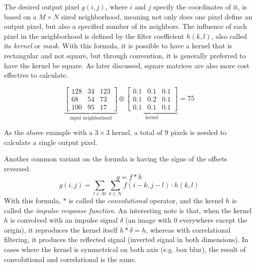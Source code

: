 \documentclass[twoside,a4paper,article]{combine}
\begin{document}
The desired output pixel $g(i, j)$, where $i$ and $j$ specify the
coordinates of it, is based on a $M \times N$ sized neighborhood, 
meaning not only does one pixel define an output pixel, but also a specified number
of its neighbors. The influence of each pixel in the neighborhood is defined by the filter coefficient $h(k, l)$,
also called its \emph{kernel} or \emph{mask}\cite{Szeliski_2022}. With this formula, it is possible to have a kernel that is rectangular and not square,
but through convention, it is generally preferred to have the kernel be square. As later discussed, square matrices are also more cost effective to calculate.

\[
\underbrace{
    \begin{bmatrix}
        128 & 34 & 123\\
        68 & 54 & 73 \\
        100 & 95 & 17
    \end{bmatrix}}_{\text{input neighborhood}}
\otimes
\underbrace{
    \begin{bmatrix}
        0.1 & 0.1 & 0.1\\
        0.1 & 0.2 & 0.1\\
        0.1 & 0.1 & 0.1
    \end{bmatrix}}_{\text{kernel}}
= 75
\]

As the above example with a $3 \times 3$ kernel, a total of 9 pixels is needed to calculate a single output pixel.

Another common variant on the formula is having the signs of the offsets reversed. 
\[
    g = f \ast h
\]
\[
    g(i,j) = \sum_{l \in \mathscr{M}}\sum_{k \in \mathscr{N}}{f(i-k, j-l) \cdot h(k, l)}
\]
With this formula, $\ast$ is called the \emph{convolutional} operator, and the kernel $h$ is called the \emph{impulse response function}. 
An interesting note is that, when the kernel $h$ is convolved with an impulse signal $\delta$ (an image with 0 everywhere except the origin),
it reproduces the kernel itself $h \ast \delta = h$, whereas with correlational filtering, 
it produces the reflected signal (inverted signal in both dimensions).\cite{Szeliski_2022} In cases
where the kernel is symmetrical on both axis (e.g. box blur), the result of convolutional and correlational is the same.
\end{document}

